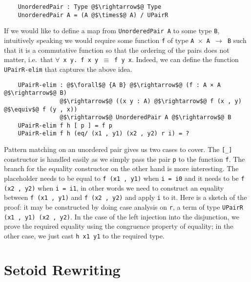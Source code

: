 \documentclass[12pt,twoside,maitrise]{dms}
\theoremstyle{definition}
\numberwithin{equation}{section}
\numberwithin{table}{chapter}
\numberwithin{figure}{chapter}
\newcommand\id[1] {\texttt{#1}}
\newcommand\fn[1] {\texttt{#1}}
\begin{document}
\begin{verbatim}
    UnorderedPair : Type @$\rightarrow$@ Type
    UnorderedPair A = (A @$\times$@ A) / UPairR
\end{verbatim}

If we would like to define a map from \fn{UnorderedPair A} to some type \id{B},
intuitively speaking we would require some function \id{f} of type \fn{A
  $\times$ A $\rightarrow$ B} such that it is a commutative function so that the
ordering of the pairs does not matter, i.e.\ that \fn{$\forall$ x y. f x y
  $\equiv$ f y x}. Indeed, we can define the function \id{UPairR-elim} that
captures the above idea.

\begin{verbatim}
    UPairR-elim : @$\forall$@ {A B} @$\rightarrow$@ (f : A × A @$\rightarrow$@ B)
                @$\rightarrow$@ ((x y : A) @$\rightarrow$@ f (x , y) @$\equiv$@ f (y , x))
                @$\rightarrow$@ UnorderedPair A @$\rightarrow$@ B
    UPairR-elim f h [ p ] = f p
    UPairR-elim f h (eq/ (x1 , y1) (x2 , y2) r i) = ?
\end{verbatim}

Pattern matching on an unordered pair gives us two cases to cover. The \id{[\_]}
constructor is handled easily as we simply pass the pair \id{p} to the function
\id{f}. The branch for the equality constructor on the other hand is more
interesting. The placeholder needs to be equal to \fn{f (x1 , y1)} when \fn{i =
  i0} and it needs to be \fn{f (x2 , y2)} when \fn{i = i1}, in other words we
need to construct an equality between \fn{f (x1 , y1)} and \fn{f (x2 , y2)} and
apply \id{i} to it. Here is a sketch of the proof: it may be constructed by
doing case analysis on \id{r}, a term of type \fn{UPairR (x1 , y1) (x2 , y2)}.
In the case of the left injection into the disjunction, we prove the required
equality using the congruence property of equality; in the other case, we just
cast \fn{h x1 y1} to the required type.

\section{Setoid Rewriting}
\end{document}
